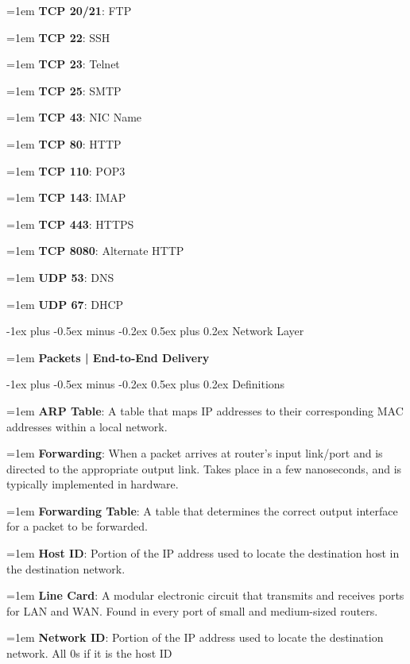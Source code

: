 \documentclass[letterpaper,8pt]{extarticle}
\makeatletter
\newcommand{\definition}[2]{
  \hangindent=1em
  \textbf{#1}: #2%
}
\newcommand{\subtitle}[2]{
  \hangindent=1em
  \textbf{\color{h4}#1 | #2}\\
  \hrulefill
}
\renewcommand{\section}{\@startsection{section}{1}{0mm}%
  {-1ex plus -0.5ex minus -0.2ex}%
  {0.5ex plus 0.2ex}%
{\color{h1} \normalfont\small\bfseries}}
\renewcommand{\subsection}{\@startsection{subsection}{2}{0mm}%
  {-1ex plus -0.5ex minus -0.2ex}%
  {0.5ex plus 0.2ex}%
{\color{h2}\normalfont\fontsize{6}{6}\selectfont\bfseries}}
\makeatother
\begin{document}
\begin{multicols*}{5}
\begin{multicols*}{3}
    \definition{TCP 20/21}{FTP}
    
    \definition{TCP 22}{SSH}
    
    \definition{TCP 23}{Telnet}
    
    \definition{TCP 25}{SMTP}
    
    \definition{TCP 43}{NIC Name}
    
    \definition{TCP 80}{HTTP}
    
    \definition{TCP 110}{POP3}
    
    \definition{TCP 143}{IMAP}
    
    \definition{TCP 443}{HTTPS}
    
    \definition{TCP 8080}{Alternate HTTP}
    
    \definition{UDP 53}{DNS}
    
    \definition{UDP 67}{DHCP}
    
  \end{multicols*}
  
  \section{Network Layer}
  
  \subtitle{Packets}{End-to-End Delivery}
  
  \subsection{Definitions}
  
  \definition{ARP Table}{A table that maps IP addresses to their corresponding MAC addresses within a local network.}
  
  \definition{Forwarding}{When a packet arrives at router's input link/port and is directed to the appropriate output link. Takes place in a few nanoseconds, and is typically implemented in hardware.}
  
  \definition{Forwarding Table}{A table that determines the correct output interface for a packet to be forwarded.}
  
  \definition{Host ID}{Portion of the IP address used to locate the destination host in the destination network.}
  
  \definition{Line Card}{A modular electronic circuit that transmits and receives ports for LAN and WAN. Found in every port of small and medium-sized routers.}
  
  \definition{Network ID}{Portion of the IP address used to locate the destination network. All 0s if it is the host ID}
  

\end{multicols*}
\end{document}
